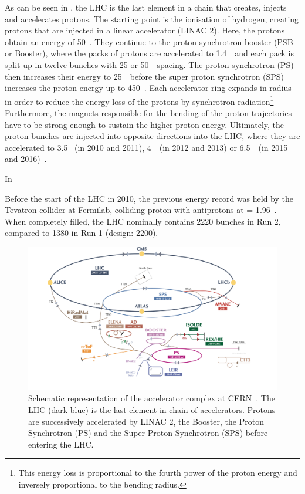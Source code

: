  As can be seen in , the LHC is the last element in a chain that creates, injects and accelerates protons. The starting point is the ionisation of hydrogen, creating protons that are injected in a linear accelerator (LINAC 2). Here, the protons obtain an energy of 50~\MeV. They continue to the proton synchrotron booster (PSB or Booster), where the packs of protons are accelerated to 1.4~\GeV\ and each pack is split up in twelve bunches with 25 or 50~\nano\s\ spacing. The proton synchrotron (PS) then increases their energy to 25~\GeV\ before the super proton synchrotron (SPS) increases the proton energy up to 450~\GeV. Each accelerator ring expands in radius in order to reduce the energy loss of the protons by synchrotron radiation\footnote{This energy loss is proportional to the fourth power of the proton energy and inversely proportional to the bending radius.} Furthermore, the magnets responsible for the bending of the proton trajectories have to be strong enough to sustain the higher proton energy. Ultimately, the proton bunches are injected into opposite directions into the LHC, where they are accelerated to 3.5 \TeV\ (in 2010 and 2011), 4~\TeV\ (in 2012 and 2013) or 6.5~\TeV\ (in 2015 and 2016)~\cite{Wenninger:2254678}. 
 
In 
 
 Before the start of the LHC in 2010, the previous energy record was held by the Tevatron collider at Fermilab, colliding proton with antiprotons at \com = 1.96~\TeV.  When completely filled, the LHC nominally contains 2220 bunches in Run 2, compared to 1380 in Run 1 (design: 2200). 
 \begin{figure}[h]
 	\centering
 	\includegraphics[width=1.\textwidth]{2_ExperimentalSetup/Figures/CCC-v2016}
 	\caption{Schematic representation of the accelerator complex at CERN~\cite{DeMelis:2197559}. The LHC (dark blue) is the last element in chain of accelerators. Protons are successively accelerated by LINAC 2, the Booster, the Proton Synchrotron (PS) and the Super Proton Synchrotron (SPS) before entering the LHC.}
 	\label{fig:LHCchain}
 \end{figure}

